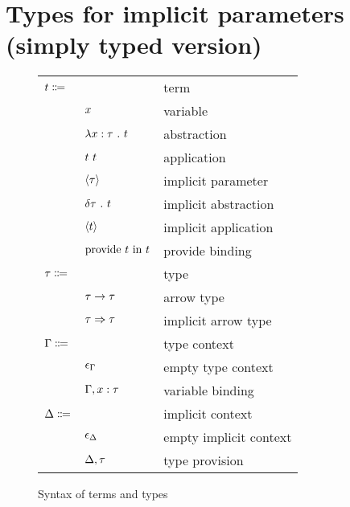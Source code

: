 \documentclass[acmlarge]{acmart}
\begin{document}
\section{Types for implicit parameters (simply typed version)}

  \begin{figure}
    \begin{mdframed}

      \begin{tabular}{l l l}
        $t \Coloneqq $ & & term \\
        & $x$ & variable \\
        & $\lambda x : \tau \ . \ t$ & abstraction \\
        & $t \ t$ & application \\
        & $\left\langle \tau \right\rangle$ & implicit parameter \\
        & $\delta \tau \ . \ t$ & implicit abstraction \\
        & $\left\langle t \right\rangle$ & implicit application \\
        & $\text{provide } t \text{ in } t$ & provide binding \\
        $\tau \Coloneqq$ & & type \\
        & $\tau \rightarrow \tau$ & arrow type \\
        & $\tau \Rightarrow \tau$ & implicit arrow type \\
        $\Gamma \Coloneqq$ & & type context \\
        & $\epsilon_{\Gamma}$ & empty type context \\
        & $\Gamma, x : \tau$ & variable binding \\
        $\Delta \Coloneqq$ & & implicit context \\
        & $\epsilon_{\Delta}$ & empty implicit context \\
        & $\Delta, \tau$ & type provision
      \end{tabular}

      \caption{Syntax of terms and types}
      \label{fig:terms_syntax}

    \end{mdframed}
  \end{figure}
\end{document}
